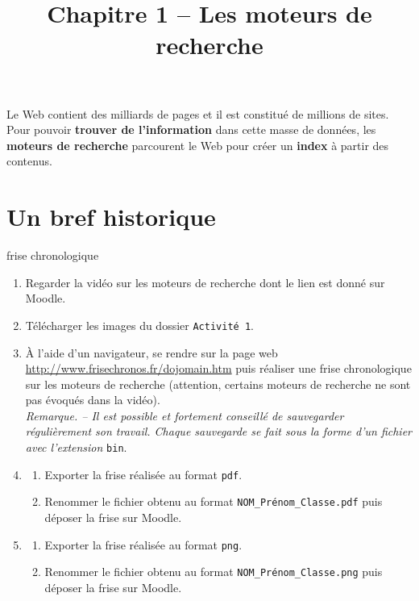 \documentclass[a4paper, dvipsnames]{article}
\title{Chapitre 1 -- Les moteurs de recherche}
\author{}
\date{}
\begin{document}
\renewcommand{\contentsname}{}

\pagestyle{fancy}

\begin{tcolorbox}[colframe=blue!75, colback=blue!45, valign=center, height=1.5cm, top=5mm]
  \maketitle
\end{tcolorbox}

\tableofcontents

\vspace{1cm}

\thispagestyle{fancy}

Le Web contient des milliards de pages et il est constitué de millions de sites. Pour pouvoir \textbf{trouver de l'information} dans cette masse de données, les \textbf{moteurs de recherche} parcourent le Web pour créer un \textbf{index} à partir des contenus.

\vspace{1.5cm}

\section{Un bref historique}

\begin{activite}{frise chronologique}{}
  \begin{enumerate}
    \item Regarder la vidéo sur les moteurs de recherche dont le lien est donné sur Moodle.
    \item Télécharger les images du dossier \verb|Activité 1|.
    \item À l'aide d'un navigateur, se rendre sur la page web \url{http://www.frisechronos.fr/dojomain.htm} puis réaliser une frise chronologique sur les moteurs de recherche (attention, certains moteurs de recherche ne sont pas évoqués dans la vidéo).\\
      \textit{Remarque. -- Il est possible et fortement conseillé de sauvegarder régulièrement son travail. Chaque sauvegarde se fait sous la forme d'un fichier avec l'extension} \verb|bin|.
    \item 
      \begin{enumerate}
	\item Exporter la frise réalisée au format \verb|pdf|.
	\item Renommer le fichier obtenu au format \verb|NOM_Prénom_Classe.pdf| puis déposer la frise sur Moodle.
      \end{enumerate}
    \item 
      \begin{enumerate}
	\item Exporter la frise réalisée au format \verb|png|.
	\item Renommer le fichier obtenu au format \verb|NOM_Prénom_Classe.png| puis déposer la frise sur Moodle.
      \end{enumerate}
  \end{enumerate}
\end{activite}
\end{document}
